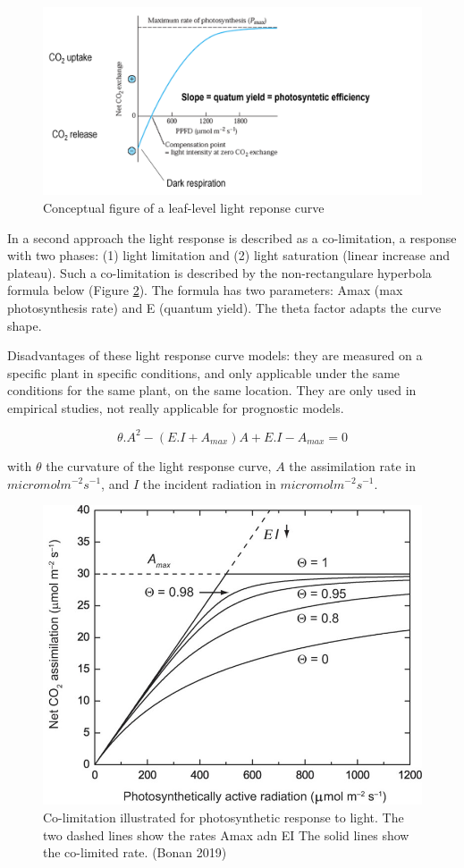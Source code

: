 \documentclass[12pt,oneside]{book}
\begin{document}
\begin{figure}

{\centering \includegraphics[width=0.8\linewidth]{figures/chap2/LRC} 

}

\caption{Conceptual figure of a leaf-level light reponse curve}\label{fig:f24}
\end{figure}

In a second approach the light response is described as a co-limitation,
a response with two phases: (1) light limitation and (2) light
saturation (linear increase and plateau). Such a co-limitation is
described by the non-rectangulare hyperbola formula below (Figure
\ref{fig:f25}). The formula has two parameters: Amax (max photosynthesis
rate) and E (quantum yield). The theta factor adapts the curve shape.

Disadvantages of these light response curve models: they are measured on
a specific plant in specific conditions, and only applicable under the
same conditions for the same plant, on the same location. They are only
used in empirical studies, not really applicable for prognostic models.

\[
\theta.A^2-(E.I+A_{max})A+E.I-A_{max}=0
\]

with \(\theta\) the curvature of the light response curve, \(A\) the
assimilation rate in \(micromol m^{-2} s^{-1}\), and \(I\) the incident
radiation in \(micromol m^{-2} s^{-1}\).

\begin{figure}

{\centering \includegraphics[width=0.8\linewidth]{figures/chap2/hyperbola} 

}

\caption{Co-limitation illustrated for photosynthetic response to light. The two dashed lines show the rates Amax adn EI The solid lines show the co-limited rate. (Bonan 2019)}\label{fig:f25}
\end{figure}
\end{document}
